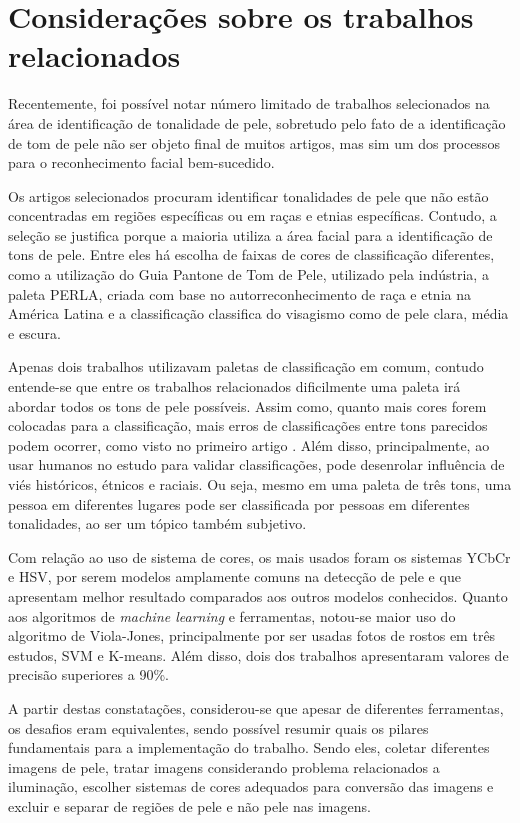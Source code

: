 \section{Considerações sobre os trabalhos relacionados}

Recentemente, foi possível notar número limitado de trabalhos selecionados na área de identificação de tonalidade de pele, sobretudo pelo fato de a identificação de tom de pele não ser objeto final de muitos artigos, mas sim um dos processos para o reconhecimento facial bem-sucedido. 

Os artigos selecionados procuram identificar tonalidades de pele que não estão concentradas em regiões específicas ou em raças e etnias específicas. Contudo, a seleção se justifica porque a maioria utiliza a área facial para a identificação de tons de pele. Entre eles há escolha de faixas de cores de classificação diferentes, como a utilização do Guia Pantone de Tom de Pele, utilizado pela indústria, a paleta PERLA, criada com base no autorreconhecimento de raça e etnia na América Latina e a classificação classifica do visagismo como de pele clara, média e escura.

Apenas dois trabalhos utilizavam paletas de classificação em comum, contudo entende-se que entre os trabalhos relacionados dificilmente uma paleta irá abordar todos os tons de pele possíveis. Assim como, quanto mais cores forem colocadas para a classificação, mais erros de classificações entre tons parecidos podem ocorrer, como visto no primeiro artigo \cite{Facial_skin_colour_classification_using_machine_learning_and_hyperspectral_imaging_data}. Além disso, principalmente, ao usar humanos no estudo para validar classificações, pode desenrolar influência de viés históricos, étnicos e raciais. Ou seja, mesmo em uma paleta de três tons, uma pessoa em diferentes lugares pode ser classificada por pessoas em diferentes tonalidades, ao ser um tópico também subjetivo.

Com relação ao uso de sistema de cores, os mais usados foram os sistemas YCbCr e HSV, por serem modelos amplamente comuns na detecção de pele e que apresentam melhor resultado comparados aos outros modelos conhecidos. Quanto aos algoritmos de \textit{machine learning} e ferramentas, notou-se maior uso do algoritmo de Viola-Jones, principalmente por ser usadas fotos de rostos em três estudos, SVM e K-means. Além disso, dois dos trabalhos apresentaram valores de precisão superiores a 90\%.

A partir destas constatações, considerou-se que apesar de diferentes ferramentas, os desafios eram equivalentes, sendo possível resumir quais os pilares fundamentais para a implementação do trabalho. Sendo eles, coletar diferentes imagens de pele, tratar imagens considerando problema relacionados a iluminação, escolher sistemas de cores adequados para conversão das imagens e excluir e separar de regiões de pele e não pele nas imagens.


